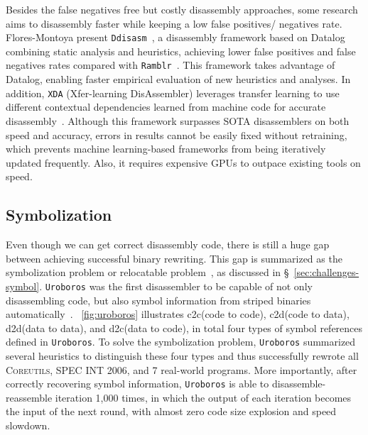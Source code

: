 Besides the false negatives free but costly disassembly approaches, some 
research aims to disassembly faster while keeping a low false positives/
negatives rate. Flores-Montoya \etal present \texttt{Ddisasm}~\cite
{flores2020datalog}, a disassembly framework based on Datalog combining static 
analysis and heuristics, achieving lower false positives and false negatives 
rates compared with \texttt{Ramblr}~\cite{wang2017ramblr}. This framework takes 
advantage of Datalog, enabling faster empirical evaluation of new heuristics 
and analyses.
In addition, \texttt{XDA} (Xfer-learning DisAssembler) leverages transfer 
learning to use different contextual dependencies learned from machine code for 
accurate disassembly~\cite{pei2020xda}. Although this framework surpasses SOTA 
disassemblers on both speed and accuracy, errors in results cannot be easily 
fixed without retraining, which prevents machine learning-based frameworks from 
being iteratively updated frequently. Also, it requires expensive GPUs to 
outpace existing tools on speed.

\subsection{Symbolization} \label{sec:existing-symbolization}
Even though we can get correct disassembly code, there is still a huge gap 
between achieving successful binary rewriting. This gap is summarized as the 
symbolization problem or relocatable problem~\cite{wang2015reassembleable,
wang2017ramblr}, as discussed in \S~\ref{sec:challenges-symbol}. \texttt
{Uroboros} was the first disassembler to be capable of not only disassembling 
code, but also symbol information from striped binaries automatically~\cite
{wang2015reassembleable}. \F~\ref{fig:uroboros} illustrates c2c(code to code), 
c2d(code to data), d2d(data to data), and d2c(data to code), in total four 
types of symbol references defined in \texttt{Uroboros}. To solve the 
symbolization problem, \texttt{Uroboros} summarized several heuristics to 
distinguish these four types and thus successfully rewrote all \textsc
{Coreutils}, \textsc{SPEC INT 2006}, and 7 real-world programs. More 
importantly, after correctly recovering symbol information, \texttt{Uroboros} 
is able to disassemble-reassemble iteration 1,000 times, in which the output of 
each iteration becomes the input of the next round, with almost zero code size 
explosion and speed slowdown.

